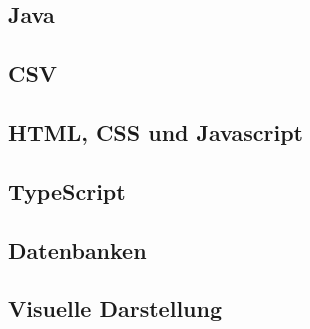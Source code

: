 

\begin{spacing}{1}
    \section{Java }\label{section:allTechJava}
    \end{spacing}


\begin{spacing}{1}
    \section{CSV }\label{section:allTechCSV}
    \end{spacing}


\begin{spacing}{1}
    \section{HTML, CSS und Javascript }\label{section:allTechHTMLCSS}
    \end{spacing}

 
\begin{spacing}{1}
    \section{TypeScript}\label{section:allTechTypescript}
    \end{spacing}

 
\begin{spacing}{1}
    \section{Datenbanken }\label{section:database}
    \end{spacing}


\begin{spacing}{1}
    \section{Visuelle Darstellung }\label{section:gui}
    \end{spacing}


